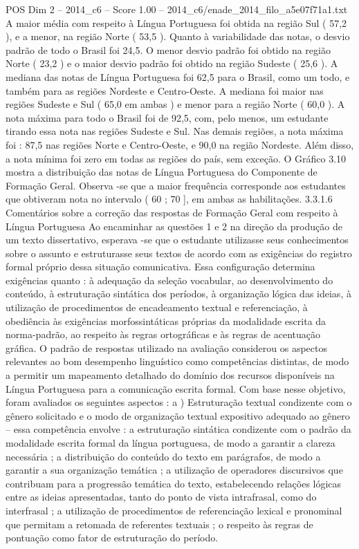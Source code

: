 \begin{textsample}{POS Dim 2 – 2014\_c6 – Score 1.00 – 2014\_c6/enade\_2014\_filo\_a5e07f71a1.txt}
A maior média com respeito à Língua Portuguesa foi obtida na região Sul ( 57,2 ), e a menor, na região Norte ( 53,5 ).
Quanto à variabilidade das notas, o desvio padrão de todo o Brasil foi 24,5.
O menor desvio padrão foi obtido na região Norte ( 23,2 ) e o maior desvio padrão foi obtido na região Sudeste ( 25,6 ).
A mediana das notas de Língua Portuguesa foi 62,5 para o Brasil, como um todo, e também para as regiões Nordeste e Centro-Oeste.
A mediana foi maior nas regiões Sudeste e Sul ( 65,0 em ambas ) e menor para a região Norte ( 60,0 ).
A nota máxima para todo o Brasil foi de 92,5, com, pelo menos, um estudante tirando essa nota nas regiões Sudeste e Sul.
Nas demais regiões, a nota máxima foi : 87,5 nas regiões Norte e Centro-Oeste, e 90,0 na região Nordeste.
Além disso, a nota mínima foi zero em todas as regiões do país, sem exceção.
O Gráfico 3.10 mostra a distribuição das notas de Língua Portuguesa do Componente de Formação Geral.
Observa -se que a maior frequência corresponde aos estudantes que obtiveram nota no intervalo ( 60 ; 70 ], em ambas as habilitações. 3.3.1.6 Comentários sobre a correção das respostas de Formação Geral com respeito à Língua Portuguesa Ao encaminhar as questões 1 e 2 na direção da produção de um texto dissertativo, esperava -se que o estudante utilizasse seus conhecimentos sobre o assunto e estruturasse seus textos de acordo com as exigências do registro formal próprio dessa situação comunicativa.
Essa configuração determina exigências quanto : à adequação da seleção vocabular, ao desenvolvimento do conteúdo, à estruturação sintática dos períodos, à organização lógica das ideias, à utilização de procedimentos de encadeamento textual e referenciação, à obediência às exigências morfossintáticas próprias da modalidade escrita da norma-padrão, ao respeito às regras ortográficas e às regras de acentuação gráfica.
O padrão de respostas utilizado na avaliação considerou os aspectos relevantes ao bom desempenho linguístico como competências distintas, de modo a permitir um mapeamento detalhado do domínio dos recursos disponíveis na Língua Portuguesa para a comunicação escrita formal.
Com base nesse objetivo, foram avaliados os seguintes aspectos : a ) Estruturação textual condizente com o gênero solicitado e o modo de organização textual expositivo adequado ao gênero – essa competência envolve : a estruturação sintática condizente com o padrão da modalidade escrita formal da língua portuguesa, de modo a garantir a clareza necessária ; a distribuição do conteúdo do texto em parágrafos, de modo a garantir a sua organização temática ; a utilização de operadores discursivos que contribuam para a progressão temática do texto, estabelecendo relações lógicas entre as ideias apresentadas, tanto do ponto de vista intrafrasal, como do interfrasal ; a utilização de procedimentos de referenciação lexical e pronominal que permitam a retomada de referentes textuais ; o respeito às regras de pontuação como fator de estruturação do período.

\end{textsample}
